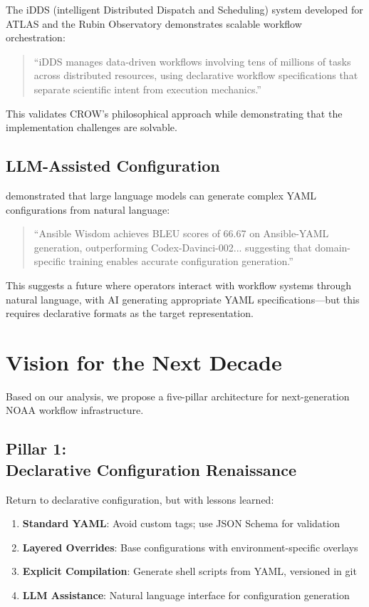 \documentclass[11pt,twocolumn]{article}
\begin{document}
The iDDS (intelligent Distributed Dispatch and Scheduling) system developed for ATLAS and the Rubin Observatory \cite{idds2025} demonstrates scalable workflow orchestration:

\begin{quote}
``iDDS manages data-driven workflows involving tens of millions of tasks across distributed resources, using declarative workflow specifications that separate scientific intent from execution mechanics.''
\end{quote}

This validates CROW's philosophical approach while demonstrating that the implementation challenges are solvable.

\subsection{LLM-Assisted Configuration}

\cite{pujar2023ansible_wisdom} demonstrated that large language models can generate complex YAML configurations from natural language:

\begin{quote}
``Ansible Wisdom achieves BLEU scores of 66.67 on Ansible-YAML generation, outperforming Codex-Davinci-002... suggesting that domain-specific training enables accurate configuration generation.''
\end{quote}

This suggests a future where operators interact with workflow systems through natural language, with AI generating appropriate YAML specifications---but this requires declarative formats as the target representation.

\section{Vision for the Next Decade}

Based on our analysis, we propose a five-pillar architecture for next-generation NOAA workflow infrastructure.

\subsection{Pillar 1:\\ Declarative Configuration Renaissance}

Return to declarative configuration, but with lessons learned:

\begin{enumerate}
    \item \textbf{Standard YAML}: Avoid custom tags; use JSON Schema for validation
    \item \textbf{Layered Overrides}: Base configurations with environment-specific overlays
    \item \textbf{Explicit Compilation}: Generate shell scripts from YAML, versioned in git
    \item \textbf{LLM Assistance}: Natural language interface for configuration generation
\end{enumerate}
\end{document}
